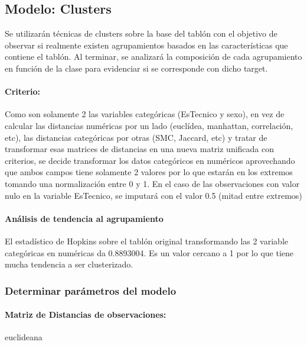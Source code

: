 \subsection{Modelo: Clusters}

Se utilizarán técnicas de clusters sobre la base del tablón con el objetivo de observar si realmente existen agrupamientos basados en las características que contiene el tablón. Al terminar, se analizará la composición de cada agrupamiento en función de la clase para evidenciar si se corresponde con dicho target. \\

\paragraph{\textbf{Criterio:}}

Como son solamente 2 las variables categóricas (EsTecnico y
sexo), en vez de calcular las distancias numéricas por un lado
(euclídea, manhattan, correlación, etc), las distancias categóricas por
otras (SMC, Jaccard, etc) y tratar de transformar esas matrices de
distancias en una nueva matriz unificada con criterios, se decide
transformar los datos categóricos en numéricos aprovechando que ambos
campos tiene solamente 2 valores por lo que estarán en los extremos
tomando una normalización entre 0 y 1. En el caso de las observaciones con valor nulo en la variable EsTecnico, se imputará con el valor
0.5 (mitad entre extremos)

\paragraph{Análisis de tendencia al agrupamiento}

El estadístico de Hopkins sobre el tablón original transformando las 2
variable categóricas en numéricas da 0.8893004. Es un valor cercano a 1
por lo que tiene mucha tendencia a ser clusterizado.

\subsubsection{\textbf{Determinar parámetros del modelo}}

\paragraph{\textbf{Matriz de Distancias de observaciones:}} euclideana

